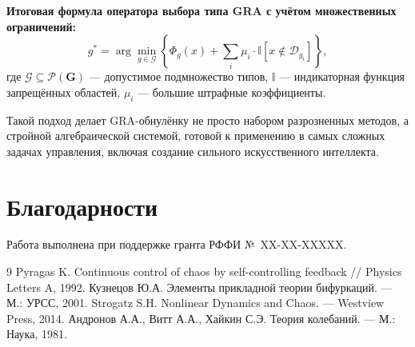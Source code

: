 \documentclass[12pt,a4paper]{article}
\newcommand{\G}{\mathbf{G}}
\newcommand{\Pset}{\mathcal{P}}
\begin{document}
\textbf{Итоговая формула оператора выбора типа GRA с учётом множественных ограничений:}
\begin{equation}
    g^* = \arg\min_{g \in \mathcal{G}} \left\{ \Phi_g(x) + \sum_{i} \mu_i \cdot \mathbb{I}[x \notin \mathcal{D}_{g_i}] \right\},
\end{equation}
где $\mathcal{G} \subseteq \Pset(\G)$ — допустимое подмножество типов, $\mathbb{I}$ — индикаторная функция запрещённых областей, $\mu_i$ — большие штрафные коэффициенты.

Такой подход делает GRA-обнулёнку не просто набором разрозненных методов, а стройной алгебраической системой, готовой к применению в самых сложных задачах управления, включая создание сильного искусственного интеллекта.

\section*{Благодарности}
Работа выполнена при поддержке гранта РФФИ №~XX-XX-XXXXX.

\begin{thebibliography}{9}
 Pyragas K. Continuous control of chaos by self-controlling feedback // Physics Letters A, 1992.
 Кузнецов Ю.А. Элементы прикладной теории бифуркаций. — М.: УРСС, 2001.
 Strogatz S.H. Nonlinear Dynamics and Chaos. — Westview Press, 2014.
 Андронов А.А., Витт А.А., Хайкин С.Э. Теория колебаний. — М.: Наука, 1981.
\end{thebibliography}
\end{document}

